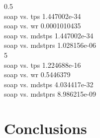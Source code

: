 \documentclass[10pt]{article}
\begin{document}
0.5\\
soap vs.  tps 1.447002e-34 \\
soap vs.  wr 0.0001010435 \\
soap vs.  mdstps 1.447002e-34 \\
soap vs.  mdstprs 1.028156e-06 \\

5\\
soap vs.  tps 1.224688e-16 \\
soap vs.  wr 0.5446379 \\
soap vs.  mdstps 4.034417e-32 \\
soap vs.  mdstprs 8.986215e-09 \\





%



\section{Conclusions}





\end{document}
